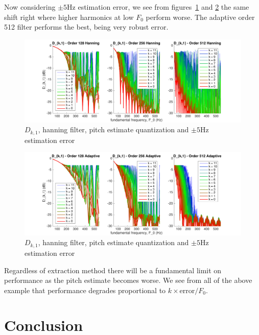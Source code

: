 \documentclass [11pt, proquest,oneside] {uwthesis}[2015/03/03]
\begin{document}
Now considering $\pm5$Hz estimation error, we see from figures~\ref{fig:pitch_d_ki_1_error5} and \ref{fig:pitch_d_ki_2_error5} the same shift right where higher harmonics at low $F_0$ perform worse.  The adaptive order 512 filter performs the best, being very robust error.

\begin{figure}[!ht]
  \centering
    \includegraphics[width=1\textwidth]{pitch_d_ki_1_error5}
    \caption{$D_{k,1}$, hanning filter, pitch estimate quantization and $\pm5$Hz estimation error}\label{fig:pitch_d_ki_1_error5}
\end{figure}

\begin{figure}[!ht]
  \centering
    \includegraphics[width=1\textwidth]{pitch_d_ki_2_error5}
    \caption{$D_{k,1}$, hanning filter, pitch estimate quantization and $\pm5$Hz estimation error}\label{fig:pitch_d_ki_2_error5}
\end{figure}

Regardless of extraction method there will be a fundamental limit on performance as the pitch estimate becomes worse.  We see from all of the above example that performance degrades proportional to $k \times \mathrm{error} / F_0$.


\chapter{Conclusion}
\end{document}
